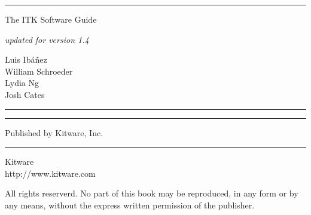 
\begin{minipage}[t][3cm][b]{\textwidth}
\rule{14cm}{1pt}
\end{minipage}


\begin{minipage}[t][3cm][b]{\textwidth}
\Huge
The ITK Software Guide\\
\normalsize
\par
\emph{updated for version 1.4}\\
\end{minipage}

\hfill
\begin{minipage}[t][6cm][b]{0.6\textwidth}
\Large
\renewcommand{\baselinestretch}{1.5}
Luis Ib\'{a}\~{n}ez\\
William Schroeder\\
Lydia Ng\\
Josh Cates\\
\normalsize
\end{minipage}


\begin{minipage}[t][2cm][b]{\textwidth}
\rule{14cm}{1pt}
\end{minipage}

\newpage

\begin{minipage}[t][3cm][b]{\textwidth}
\rule{14cm}{1pt}
\end{minipage}


\begin{minipage}[t][5cm][b]{\textwidth}
Published by Kitware, Inc.
\end{minipage}

\begin{minipage}[t][2cm][b]{\textwidth}
\rule{14cm}{1pt}
\end{minipage}


\newpage

\begin{minipage}[t][3cm][b]{\textwidth}
\Huge
Kitware\\
\normalsize
http://www.kitware.com
\end{minipage}


\begin{minipage}[t][3cm][b]{\textwidth}
\begin{center}
All rights reserverd. No part of this book may be reproduced, in any form or by any means, without the express written permission of the publisher.
\end{center}
\end{minipage}


